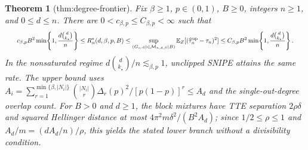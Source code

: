 \documentclass{article}
\newtheorem{theorem}{Theorem}
\begin{document}
\begin{theorem}[thm:degree-frontier]\label{thm:degree-frontier}
Fix \(\beta\ge1\), \(p\in(0,1)\), \(B\ge0\), integers \(n\ge1\), and \(0\le d\le n\). There are \(0<c_{\beta,p}\le C_{\beta,p}<\infty\) such that \[
\makebox[\linewidth][c]{\resizebox{0.98\linewidth}{!}{\par\noindent \makebox[\linewidth][c]{\resizebox{0.98\linewidth}{!}{\(\displaystyle \displaystyle c_{\beta,p}B^2\min\!\left\{1,\frac{d\binom{d}{k_\star}}{n}\right\}\le R_n^\star(d,\beta,p,B)\le\sup_{(G_n,c)\in\mathcal M_{n,d,\beta}(B)}\mathbb E_Z[(\widehat\tau_n^{\mathrm{up}}-\tau_n)^2]\le C_{\beta,p}B^2\min\!\left\{1,\frac{d\binom{d}{k_\star}}{n}\right\}.\)}}\par\noindent}}
\] In the nonsaturated regime \(d\binom{d}{k_\star}/n\lesssim_{\beta,p}1\), unclipped SNIPE attains the same rate. The upper bound uses \(A_i=\sum_{r=1}^{\min\{\beta,|N_i|\}}\binom{|N_i|}{r}\Delta_r(p)^2/[p(1-p)]^r\le A_d\) and the single-out-degree overlap count. For \(B>0\) and \(d\ge1\), the block mixtures have TTE separation \(2\rho\delta\) and squared Hellinger distance at most \(4\pi^2m\delta^2/(B^2A_d)\); since \(1/2\le\rho\le1\) and \(A_d/m=(dA_d/n)/\rho\), this yields the stated lower branch without a divisibility condition.
\end{theorem}
\end{document}
